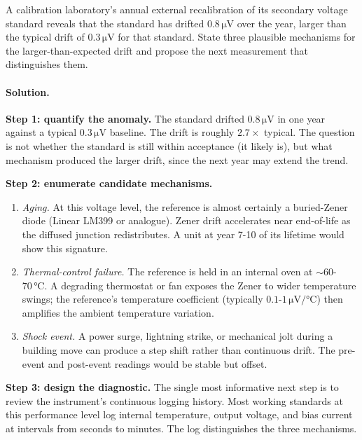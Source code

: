 \begin{exercise}
A calibration laboratory's annual external recalibration of its
secondary voltage standard reveals that the standard has drifted
$0.8 \,\si{\micro\volt}$ over the year, larger than the typical
drift of $0.3 \,\si{\micro\volt}$ for that standard. State three
plausible mechanisms for the larger-than-expected drift and propose
the next measurement that distinguishes them.

\paragraph{Solution.}
\textbf{Step 1: quantify the anomaly.} The standard drifted
$0.8 \,\si{\micro\volt}$ in one year against a typical
$0.3 \,\si{\micro\volt}$ baseline. The drift is roughly $2.7\times$
typical. The question is not whether the standard is still within
acceptance (it likely is), but what mechanism produced the larger
drift, since the next year may extend the trend.

\textbf{Step 2: enumerate candidate mechanisms.}
\begin{enumerate}
  \item \emph{Aging.} At this voltage level, the reference is
  almost certainly a buried-Zener diode (Linear LM399 or analogue).
  Zener drift accelerates near end-of-life as the diffused junction
  redistributes. A unit at year 7-10 of its lifetime would show
  this signature.
  \item \emph{Thermal-control failure.} The reference is held in
  an internal oven at $\sim 60$-$70 \,\si{\degreeCelsius}$. A
  degrading thermostat or fan exposes the Zener to wider temperature
  swings; the reference's temperature coefficient (typically
  $0.1$-$1 \,\si{\micro\volt}/\si{\degreeCelsius}$) then amplifies
  the ambient temperature variation.
  \item \emph{Shock event.} A power surge, lightning strike, or
  mechanical jolt during a building move can produce a step shift
  rather than continuous drift. The pre-event and post-event
  readings would be stable but offset.
\end{enumerate}

\textbf{Step 3: design the diagnostic.} The single most informative
next step is to review the instrument's continuous logging history.
Most working standards at this performance level log internal
temperature, output voltage, and bias current at intervals from
seconds to minutes. The log distinguishes the three mechanisms.


\end{exercise}
